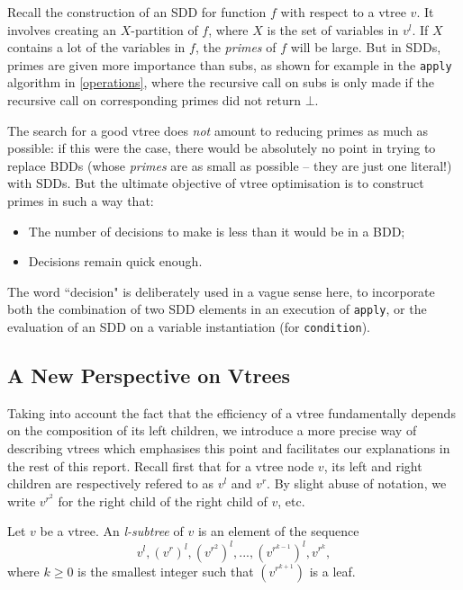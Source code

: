 \documentclass[11pt]{report}
\newenvironment{definition}[1][Definition]{\begin{trivlist}
\item[\hskip \labelsep {\bfseries #1}]}{\end{trivlist}}
\begin{document}
Recall the construction of an SDD for function $f$ with respect to a vtree $v$. It involves creating an $X$-partition of $f$, where $X$ is the set of variables in $v^l$. If $X$ contains a lot of the variables in $f$, the \textit{primes} of $f$ will be large. But in SDDs, primes are given more importance than subs, as shown for example in the \texttt{apply} algorithm in \ref{operations}, where the recursive call on subs is only made if the recursive call on corresponding primes did not return $\bot$.

The search for a good vtree does \textit{not }amount to reducing primes as much as possible: if this were the case, there would be absolutely no point in trying to replace BDDs (whose \textit{primes} are as small as possible -- they are just one literal!) with SDDs. But the ultimate objective of vtree optimisation is to construct primes in such a way that: \begin{itemize}
\item The number of decisions to make is less than it would be in a BDD;
\item Decisions remain quick enough.
\end{itemize}
The word ``decision" is deliberately used in a vague sense here, to incorporate both the combination of two SDD elements in an execution of \texttt{apply}, or the evaluation of an SDD on a variable instantiation (for \texttt{condition}).

\subsection{A New Perspective on Vtrees}
\label{new_perspective}
Taking into account the fact that the efficiency of a vtree fundamentally depends on the composition of its left children, we introduce a more precise way of describing vtrees which emphasises this point and facilitates our explanations in the rest of this report. Recall first that for a vtree node $v$, its left and right children are respectively refered to as $v^l$ and $v^r$. By slight abuse of notation, we write $v^{r^2}$ for the right child of the right child of $v$, etc.

\begin{definition} Let $v$ be a vtree. An \textit{l-subtree} of $v$ is an element of the sequence $$v^l, (v^r)^l, (v^{r^2})^l, ..., (v^{r^{k-1}})^l, v^{r^k},$$ where $k \geq 0$ is the smallest integer such that $(v^{r^{k+1}})$ is a leaf.
\end{definition}
\end{document}

